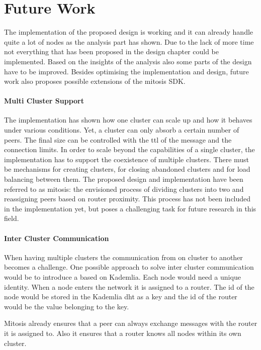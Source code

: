\section{Future Work}\label{sec:future-work}
The implementation of the proposed design is working and it can already handle quite a lot of nodes as the analysis part has shown. Due to the lack of more time not everything that has been proposed in the design chapter could be implemented. Based on the insights of the analysis also some parts of the design have to be improved.
Besides optimising the implementation and design, future work also proposes possible extensions of the \gls{mitosis} SDK.

\paragraph{Multi Cluster Support}
The implementation has shown how one cluster can scale up and how it behaves under various conditions. Yet, a cluster can only absorb a certain number of peers. The final size can be controlled with the \gls{ttl} of the \routerAlive message and the connection limits. In order to scale beyond the capabilities of a single cluster, the implementation has to support the coexistence of multiple clusters. There must be mechanisms for creating clusters, for closing abandoned clusters and for load balancing between them. The proposed design and implementation have been referred to as \gls{mitosis}: the envisioned process of dividing clusters into two and reassigning peers based on router proximity. This process has not been included in the implementation yet, but poses a challenging task for future research in this field.

\paragraph{Inter Cluster Communication}
When having multiple clusters the communication from on cluster to another becomes a challenge. One possible approach to solve inter cluster communication would be to introduce a  based on Kademlia. Each node would need a unique identity. When a node enters the network it is assigned to a router. The id of the node would be stored in the Kademlia \gls{dht} as a key and the id of the router would be the value belonging to the key. 

Mitosis already ensures that a peer can always exchange messages with the router it is assigned to. Also it ensures that a router knows all nodes within its own cluster. 

